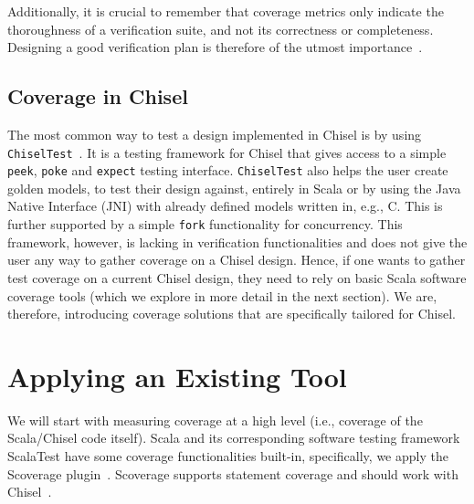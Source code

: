 \documentclass[a4paper]{IEEEtran}
\newcommand{\martin}[1]{{\color{blue} Martin: #1}}
\begin{document}
Additionally, it is crucial to remember that coverage metrics only indicate the thoroughness of a verification suite, and not its correctness or completeness. Designing a good verification plan is therefore of the utmost importance~\cite{hdlverify}. %

\subsection{Coverage in Chisel} 
The most common way to test a design implemented in Chisel is by using \texttt{ChiselTest}~\cite{chisel:tester2}. 
It is a testing framework for Chisel that gives access to a simple \texttt{peek}, \texttt{poke} and \texttt{expect} testing interface. 
\texttt{ChiselTest} also helps the user create golden models, to test their design against, entirely in Scala or by using the Java Native Interface (JNI) with already defined models written in, e.g., C. This is further supported by a simple \texttt{fork} functionality for concurrency.  
This framework, however, is lacking in verification functionalities and does not give the user any way to gather coverage on a Chisel design.
Hence, if one wants to gather test coverage on a current Chisel design, they need to rely on basic Scala software coverage tools (which we explore in more detail in the next section). 
We are, therefore, introducing coverage solutions that are specifically tailored for Chisel.

\section{Applying an Existing Tool}
We will start with measuring coverage at a high level (i.e., coverage of the Scala/Chisel code itself). Scala and its corresponding software testing framework ScalaTest have some coverage functionalities built-in, specifically, we apply the Scoverage plugin~\cite{scoverage}. Scoverage supports statement coverage and should work with Chisel~\cite{chisel:scoverage}.

\end{document}
